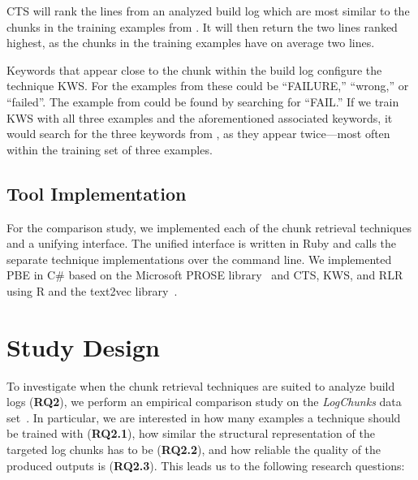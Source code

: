 CTS will rank the lines from an analyzed build log which are most
similar to the chunks in the training examples
from .
It will then return the two lines ranked highest, as the chunks in
the training examples have on average two lines.

Keywords that appear close to the chunk within
the build log configure the technique KWS\@.
For the examples from  these could be
``FAILURE,'' ``wrong,'' or ``failed''.
The example from  could be found
by searching for ``FAIL.''
If we train KWS with all three examples and the aforementioned
associated keywords, it would search for the three keywords from
, as they appear twice---most often within
the training set of three examples.

\subsection{Tool Implementation}
For the comparison study, we implemented each of the chunk retrieval
techniques and a unifying interface.
The unified interface is written in Ruby and
calls the separate technique implementations over the command line.
We implemented PBE in C\# based on the Microsoft PROSE
library~\cite{prose2019webpage} and CTS, KWS, and RLR using
R and the text2vec library~\cite{text2vec2019webpage}.

\section{Study Design}


\label{sec:study}

To investigate when the chunk retrieval techniques are suited to
analyze build logs (\textbf{RQ2}), we perform an empirical comparison
study on the \emph{LogChunks} data set~\cite{brandt2020logchunks}.
In particular, we are interested in how many examples a technique
should be trained with (\textbf{RQ2.1}),
how similar the structural representation of the targeted log chunks
has to be (\textbf{RQ2.2}), and how reliable the quality of the
produced outputs is (\textbf{RQ2.3}).
This leads us to the following research questions:

